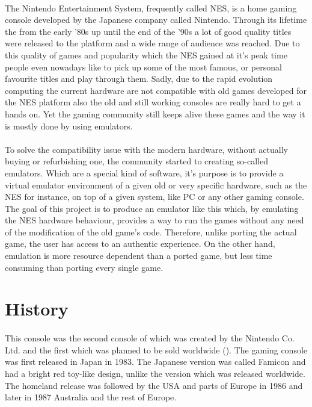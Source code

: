 \documentclass[]{report}
\begin{document}
\paragraph{}
The Nintendo Entertainment System, frequently called NES, is a home gaming console developed by the Japanese company called Nintendo.  Through its lifetime the from the early '80s up until the end of the '90s a lot of good quality titles were released to the platform and a wide range of audience was reached. Due to this quality of games and popularity which the NES gained at it's peak time people even nowadays like to pick up some of the most famous, or personal favourite titles and play through them. Sadly, due to the rapid evolution computing the current hardware are not compatible with old games developed for the NES platform also the old and still working consoles are really hard to get a hands on. Yet the gaming community still keeps alive these games and the way it is mostly done by using emulators.

\paragraph{ }
To solve the compatibility issue with the modern hardware, without actually buying or refurbishing one, the community started to creating so-called emulators. Which are a special kind of software, it's purpose is to provide a virtual emulator environment of a given old or very specific hardware, such as the NES for instance, on top of a given system, like PC or any other gaming console. The goal of this project is to produce an emulator like this which, by emulating the NES hardware behaviour, provides a way to run the games without any need of the modification of the old game's code. Therefore, unlike porting the actual game, the user has access to an authentic experience. On the other hand, emulation is more resource dependent than a ported game, but less time consuming than porting every single game.

\section{History}

\paragraph{ }
 This console was the second console of which was created by the Nintendo Co. Ltd. and the first which was planned to be sold worldwide (\cite{HIST}).
The gaming console was first released in Japan in 1983. The Japanese version was called Famicon and had a bright red toy-like design, unlike the version which was released worldwide.
The homeland release was followed by the USA and parts of Europe in 1986 and later in 1987 Australia and the rest of Europe.
\end{document}
